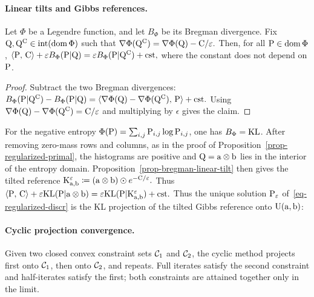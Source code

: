 \paragraph{Linear tilts and Gibbs references.}
\begin{prop}\label{prop-bregman-linear-tilt}
Let $\Phi$ be a Legendre function, and let $B_\Phi$ be its Bregman divergence. Fix $\Q,\Q^\C\in\operatorname{int}(\operatorname{dom}\Phi)$ such that
\(\nabla\Phi(\Q^\C)=\nabla\Phi(\Q)-\C/\epsilon.\)
Then, for all $\P\in\operatorname{dom}\Phi$, \(\dotp{\P}{\C}+\epsilon B_\Phi(\P|\Q) = \epsilon B_\Phi(\P|\Q^\C)+\text{\upshape cst},\)
where the constant does not depend on $\P$.
\end{prop}
\begin{proof}
Subtract the two Bregman divergences: \(B_\Phi(\P|\Q^\C)-B_\Phi(\P|\Q) = \dotp{\nabla\Phi(\Q)-\nabla\Phi(\Q^\C)}{\P} +\text{cst}.\)
Using $\nabla\Phi(\Q)-\nabla\Phi(\Q^\C)=\C/\epsilon$ and multiplying by $\epsilon$ gives the claim.
\end{proof}
For the negative entropy $\Phi(\P)=\sum_{i,j}\P_{i,j}\log\P_{i,j}$, one has $B_\Phi=\KLD$. After removing zero-mass rows and columns, as in the proof of Proposition~\ref{prop-regularized-primal}, the histograms are positive and $\Q=\a\otimes\b$ lies in the interior of the entropy domain. Proposition~\ref{prop-bregman-linear-tilt} then gives the tilted reference
\(\K_{\a,\b}^\epsilon \eqdef (\a\otimes\b)\odot e^{-\C/\epsilon}.\)
Thus
\(\dotp{\P}{\C}+\epsilon\KLD(\P|\a\otimes\b) = \epsilon\KLD(\P|\K_{\a,\b}^\epsilon)+\text{\upshape cst}.\)
Thus the unique solution $\P_\epsilon$ of~\eqref{eq-regularized-discr} is the KL projection of the tilted Gibbs reference onto $\CouplingsD(\a,\b)$:
\paragraph{Cyclic projection convergence.}
Given two closed convex constraint sets $\Cc_1$ and $\Cc_2$, the cyclic method projects first onto $\Cc_1$, then onto $\Cc_2$, and repeats. Full iterates satisfy the second constraint and half-iterates satisfy the first; both constraints are attained together only in the limit.

